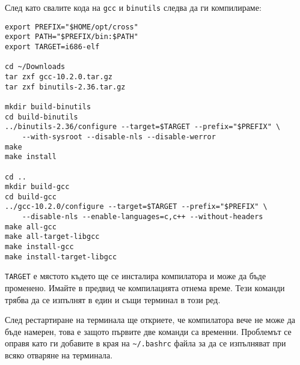 След като свалите кода на {\tt gcc} и {\tt binutils} следва да ги компилираме:
\begin{lstlisting}
export PREFIX="$HOME/opt/cross"
export PATH="$PREFIX/bin:$PATH"
export TARGET=i686-elf

cd ~/Downloads
tar zxf gcc-10.2.0.tar.gz
tar zxf binutils-2.36.tar.gz

mkdir build-binutils
cd build-binutils
../binutils-2.36/configure --target=$TARGET --prefix="$PREFIX" \
    --with-sysroot --disable-nls --disable-werror
make
make install

cd ..
mkdir build-gcc
cd build-gcc
../gcc-10.2.0/configure --target=$TARGET --prefix="$PREFIX" \
    --disable-nls --enable-languages=c,c++ --without-headers
make all-gcc
make all-target-libgcc
make install-gcc
make install-target-libgcc

\end{lstlisting}

{\tt TARGET} е мястото където ще се инсталира компилатора и може да бъде променено. Имайте в предвид че компилацията отнема време. Тези команди трябва да се изпълнят в един и същи терминал в този ред.

След рестартиране на терминала ще откриете, че компилатора вече не може да бъде намерен, това е защото първите две команди са временни. Проблемът се оправя като ги добавите в края на {\tt \~{}/.bashrc} файла за да се изпълняват при всяко отваряне на терминала.




